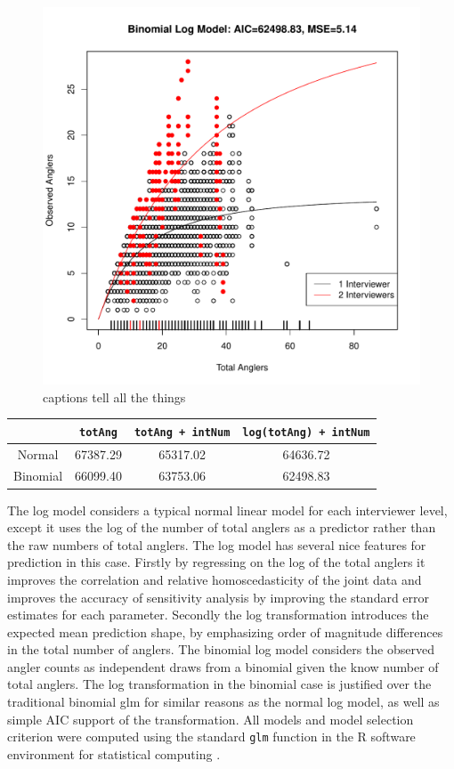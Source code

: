 \documentclass[12pt,]{article}
\begin{document}
\begin{figure}[htbp]
\centering
\includegraphics{plots/obsAngGlmLogModel.pdf}
\caption{captions tell all the things \label{obsAngLogModel}}
\end{figure}

\begin{longtable}[c]{@{}cccc@{}}
\toprule
& \verb|totAng| & \verb|totAng + intNum| &
\verb|log(totAng) + intNum|\tabularnewline
\midrule
\endhead
Normal & 67387.29 & 65317.02 & 64636.72\tabularnewline
Binomial & 66099.40 & 63753.06 & 62498.83\tabularnewline
\bottomrule
\end{longtable}

The log model considers a typical normal linear model for each
interviewer level, except it uses the log of the number of total anglers
as a predictor rather than the raw numbers of total anglers. The log
model has several nice features for prediction in this case. Firstly by
regressing on the log of the total anglers it improves the correlation
and relative homoscedasticity of the joint data and improves the
accuracy of sensitivity analysis by improving the standard error
estimates for each parameter. Secondly the log transformation introduces
the expected mean prediction shape, by emphasizing order of magnitude
differences in the total number of anglers. The binomial log model
considers the observed angler counts as independent draws from a
binomial given the know number of total anglers. The log transformation
in the binomial case is justified over the traditional binomial glm for
similar reasons as the normal log model, as well as simple AIC support
of the transformation. All models and model selection criterion were
computed using the standard \verb|glm| function in the R software
environment for statistical computing \cite{rBase}.
\end{document}
